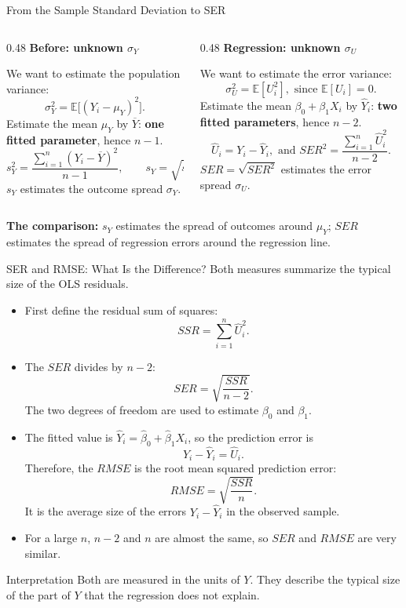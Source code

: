 \documentclass[notes,10pt, aspectratio=169]{beamer}
\begin{document}
\begin{frame}{From the Sample Standard Deviation to SER}
\footnotesize
\setlength{\abovedisplayskip}{4pt}
\setlength{\belowdisplayskip}{4pt}
\begin{columns}[T,onlytextwidth]
\begin{column}{0.48\textwidth}
\textbf{Before: unknown $\sigma_Y$}
\par\smallskip
We want to estimate the population variance:
\[
\sigma_Y^2=\mathbb{E}\big[(Y_i-\mu_Y)^2\big].
\]
Estimate the mean $\mu_Y$ by $\overline Y$: \textbf{one fitted parameter}, hence $n-1$.
\[
s_Y^2=\frac{\sum_{i=1}^n(Y_i-\overline Y)^2}{n-1},
\qquad s_Y=\sqrt{s_Y^2}.
\]
$s_Y$ estimates the outcome spread $\sigma_Y$.
\end{column}
\begin{column}{0.48\textwidth}
\textbf{Regression: unknown $\sigma_U$}
\par\smallskip
We want to estimate the error variance:
\[
\sigma_U^2=\mathbb{E}[U_i^2],\text{ since }\mathbb{E}[U_i]=0.
\]
Estimate the mean $\beta_0+\beta_1X_i$ by $\hat Y_i$: \textbf{two fitted parameters}, hence $n-2$.
\[
\hat U_i=Y_i-\hat Y_i,\text{ and }
SER^2=\frac{\sum_{i=1}^n\hat U_i^2}{n-2}.
\]
$SER=\sqrt{SER^2}$ estimates the error spread $\sigma_U$.
\end{column}
\end{columns}
\par\medskip
\textbf{The comparison:} $s_Y$ estimates the spread of outcomes around $\mu_Y$; $SER$ estimates the spread of regression errors around the regression line.
\end{frame}


\begin{frame}{SER and RMSE: What Is the Difference?}
\footnotesize
Both measures summarize the typical size of the OLS residuals.
\begin{itemize}
    \item First define the residual sum of squares:
    \[
        SSR=\sum_{i=1}^n \hat{U}_i^2.
    \]
    \item The $SER$ divides by $n-2$:
    \[
        SER=\sqrt{\frac{SSR}{n-2}}.
    \]
    The two degrees of freedom are used to estimate $\beta_0$ and $\beta_1$.
    \item The fitted value is $\widehat{Y}_i=\widehat{\beta}_0+\widehat{\beta}_1X_i$, so the prediction error is
    \[
        Y_i-\widehat{Y}_i=\widehat{U}_i.
    \]
    Therefore, the $RMSE$ is the root mean squared prediction error:
    \[
        RMSE=\sqrt{\frac{SSR}{n}}.
    \]
    It is the average size of the errors $Y_i-\widehat{Y}_i$ in the observed sample.
    \item For a large $n$, $n-2$ and $n$ are almost the same, so $SER$ and $RMSE$ are very similar.
\end{itemize}
\begin{block}{Interpretation}
Both are measured in the units of $Y$. They describe the typical size of the part of $Y$ that the regression does not explain.
\end{block}
\end{frame}
\end{document}
